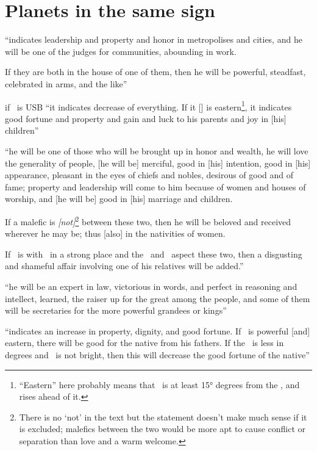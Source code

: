 \section{Planets in the same sign}
\begin{description}[style=multiline,leftmargin=1.5cm]
\item[\Jupiter,\Mars]
``indicates leadership and property and honor in metropolises and cities, and he will be one of the judges for communities, abounding in work.

If they are both in the house of one of them, then he will be powerful, steadfast, celebrated in arms, and the like''

\item[\Jupiter,\Sun]
if \Jupiter\, is USB ``it indicates decrease of everything. If it [\Jupiter] is eastern\footnote{``Eastern'' here probably means that \Jupiter\, is at least 15° degrees from the \Sun, and rises ahead of it.}, it indicates good fortune and property and gain and luck to his parents and joy in [his] children''

\item[\Jupiter,\Venus]
``he will be one of those who will be brought up in honor and wealth, he will love the generality of people, [he will be] merciful, good in [his] intention, good in [his] appearance, pleasant in the eyes of chiefs and nobles, desirous of good and of fame; property and leadership will come to him because of women and houses of worship, and [he will be] good in [his] marriage and children.

If a malefic is \textsl{[not]}\footnote{There is no `not' in the text but the statement doesn't make much sense if it is excluded; malefics between the two would be more apt to cause conflict or separation than love and a warm welcome.} between these two, then he will be beloved and received wherever he may be; thus [also] in the nativities of women.

If \Jupiter\, is with \Venus\, in a strong place and the \Moon\, and \Mars\, aspect these two, then a disgusting and shameful affair involving one of his relatives will be added.''

\item[\Jupiter,\Mercury]
``he will be an expert in law, victorious in words, and perfect in reasoning and intellect, learned, the raiser up for the great among the people, and some of them will be secretaries for the more powerful grandees or kings''

\item[\Jupiter,\Moon]
``indicates an increase in property, dignity, and good fortune. If \Jupiter\, is powerful [and] eastern, there will be good for the native from his fathers. If the \Moon\, is less in degrees and \Jupiter\, is not bright, then this will decrease the good fortune of the native''


\end{description}
